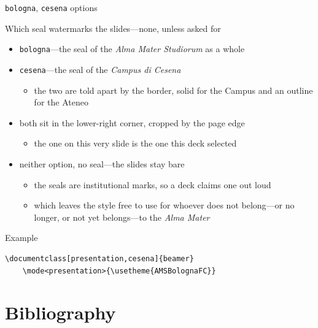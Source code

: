 \documentclass[presentation,cesena,apice]{beamer}\mode<presentation>{\usetheme{AMSBolognaFC}}
\begin{document}
\begin{frame}[c,fragile]{\texttt{bologna}, \texttt{cesena} options}
%
\begin{alertblock}{Which seal watermarks the slides---none, unless asked for}
\begin{itemize}
	\item \texttt{bologna}---the seal of the \emph{Alma Mater Studiorum} as a whole
	\item \texttt{cesena}---the seal of the \emph{Campus di Cesena}
	\begin{itemize}
		\item the two are told apart by the border, solid for the Campus and an outline for the Ateneo
	\end{itemize}
	\item both sit in the lower-right corner, cropped by the page edge
	\begin{itemize}
		\item the one on this very slide is the one this deck selected
	\end{itemize}
	\item \alert{neither option, no seal}---the slides stay bare
	\begin{itemize}
		\item the seals are institutional marks, so a deck claims one out loud
		\item which leaves the style free to use for whoever does not belong---or no longer, or not yet belongs---to the \emph{Alma Mater}
	\end{itemize}
\end{itemize}
\end{alertblock}
%
\begin{exampleblock}{Example}
{\footnotesize\begin{verbatim}
\documentclass[presentation,cesena]{beamer}
    \mode<presentation>{\usetheme{AMSBolognaFC}}
\end{verbatim}} %
\end{exampleblock}
%
\end{frame}

\section{Bibliography}
\end{document}
